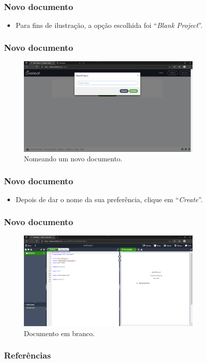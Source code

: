 \documentclass[brazilian]{beamer}
\begin{document}
\begin{frame}
    \frametitle{Novo documento}
    \begin{itemize}
        \item Para fins de ilustração, a opção escolhida foi ``\textit{Blank Project}''.
    \end{itemize}
    
    
\end{frame}

\begin{frame}
    \frametitle{Novo documento}
    \begin{figure}
        \centering
        \caption{Nomeando um novo documento.}
        \label{fig:nameOfProject}
        \includegraphics[width=0.8\textwidth]{../images/nameOfProject.png}
    \end{figure}
\end{frame}

\begin{frame}
    \frametitle{Novo documento}
    \begin{itemize}
        \item Depois de dar o nome da sua preferência, clique em ``\textit{Create}''.
    \end{itemize}
\end{frame}

\begin{frame}
    \frametitle{Novo documento}
    \begin{figure}
        \centering
        \caption{Documento em branco.}
        \label{fig:blankProject}
        \includegraphics[width=0.8\textwidth]{../images/blankProject.png}
    \end{figure}
\end{frame}

\begin{frame}
    \frametitle{Referências}
    \nocite{overleafBeamer,overleafDocumentation,overleafTemplates}
    \printbibliography[]{}
\end{frame}
\end{document}
